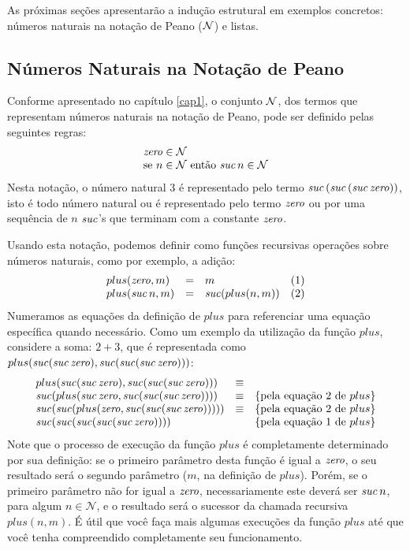 As próximas seções apresentarão a indução estrutural em exemplos
concretos: números naturais na notação de Peano ($\mathcal{N}$) e listas.

\subsection{Números Naturais na Notação de Peano}


Conforme apresentado no capítulo \ref{cap1}, o conjunto $\mathcal{N}$, dos
termos que representam números naturais na notação de Peano, pode ser definido pelas seguintes regras:
\[
   \begin{array}{l}
     \textit{zero\/} \in \mathcal{N}\\
     \text{se $n \in \mathcal{N}$ ent\~ao $\textit{suc\/}\, n\in\mathcal{N}$}
   \end{array}
\]
Nesta notação, o número natural $3$ é representado pelo termo
$\textit{suc\/}\,(\textit{suc\/}\,(\textit{suc\/}\,\textit{zero\/}))$, isto é todo número natural ou é
representado pelo termo $\textit{zero\/}$ ou por uma sequência de $n$ $\textit{suc\/}$'s
que terminam com a constante $\textit{zero\/}$.

Usando esta notação, podemos definir como funções recursivas operações
sobre números naturais, como por exemplo, a adição:
\[
\begin{array}{lclc}
plus(\textit{zero\/},m) & = & m & (1)\\
plus(\textit{suc\/}\,n,m) & = & \textit{suc\/} (plus(n,m)) & (2)
\end{array}
\]
Numeramos as equações da definição de $plus$ para referenciar uma
equação específica quando necessário.
Como um exemplo da utilização da função $plus$, considere a soma: $2 + 3$, que é
representada como $plus(\textit{suc\/}(\textit{suc\/}\,\textit{zero\/}),\textit{suc\/}(\textit{suc\/}(\textit{suc\/}\,\textit{zero\/})))$:
\[
\begin{array}{lcl}
plus(\textit{suc\/}(\textit{suc\/}\,\textit{zero\/}),\textit{suc\/}(\textit{suc\/}(\textit{suc\/}\,\textit{zero\/}))) & \equiv \\
\textit{suc\/}(plus(\textit{suc\/}\,\textit{zero\/},\textit{suc\/}(\textit{suc\/}(\textit{suc\/}\,\textit{zero\/})))) & \equiv &
\{\text{pela equação $2$ de $plus$}\}\\
\textit{suc\/}(\textit{suc\/}(plus(\textit{zero\/},\textit{suc\/}(\textit{suc\/}(\textit{suc\/}\,\textit{zero\/}))))) & \equiv &
\{\text{pela equação $2$ de $plus$}\}\\
\textit{suc\/}(\textit{suc\/}(\textit{suc\/}(\textit{suc\/}(\textit{suc\/}\,\textit{zero\/})))) & & \{\text{pela equação $1$ de $plus$}\}
\end{array}
\]
Note que o processo de execução da função $plus$ é completamente
determinado por sua definição: se o primeiro parâmetro desta função é
igual a $\textit{zero\/}$, o seu resultado será o segundo parâmetro ($m$, na
definição de $plus$). Porém, se o primeiro parâmetro não for igual a
$\textit{zero\/}$, necessariamente este deverá ser $\textit{suc\/}\,n$, para algum
$n\in\mathcal{N}$, e o resultado será o sucessor da chamada recursiva
$plus(n,m)$. É útil que você faça mais algumas execuções da função
$plus$ até que você tenha compreendido completamente seu
funcionamento.

